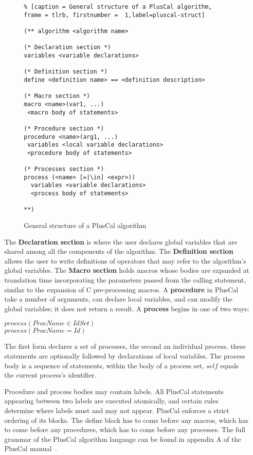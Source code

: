 \begin{figure}[!h]
\begin{lstlisting}% [caption = General structure of a PlusCal algorithm, frame = tlrb, firstnumber =  1,label=pluscal-struct]

(** algorithm <algorithm name>

(* Declaration section *)
variables <variable declarations>

(* Definition section *)
define <definition name> == <definition description>

(* Macro section *)
macro <name>(var1, ...)
 <macro body of statements>

(* Procedure section *)
procedure <name>(arg1, ...)
 variables <local variable declarations>
 <procedure body of statements>

(* Processes section *)
process (<name> [=|\in] <expr>))
  variables <variable declarations>
  <process body of statements>

**)

\end{lstlisting}
\caption{General structure of a PlusCal algorithm}
\label{pluscal-struct}
\end{figure}

The \textbf{Declaration section} is where the user declares global variables that are shared among all the components of the algorithm. The \textbf{Definition section} allows the user to write \tlaplus definitions of operators that may refer to the algorithm's global variables.
The \textbf{Macro section} holds macros whose bodies are expanded at translation time incorporating the parameters passed from the calling statement, similar to the expansion of C pre-processing macros. A \textbf{procedure} in PlusCal take a number of arguments, can declare local variables, and can modify the global variables; it does not return a result. A \textbf{process} begins in one of two ways: 
\begin{center}
$process (ProcName \in IdSet)$ \\
$process (ProcName = Id)$
\end{center}

The first form declares a set of processes, the second an individual process. these statements are optionally followed by declarations of local variables. The process body is a sequence of statements, within the body of a process set, $self$ equals the current process's identifier.

Procedure and process bodies may contain labels. All PlusCal statements appearing between two labels are executed atomically, and certain rules determine where labels must and may not appear.
PlusCal enforces a strict ordering of its blocks. The define block has to come before any macros, which has to come before any procedures, which has to come before any processes. The full grammar of the PlusCal algorithm language can be found in appendix A of the PlusCal manual~\cite{pcalAlgo}.

